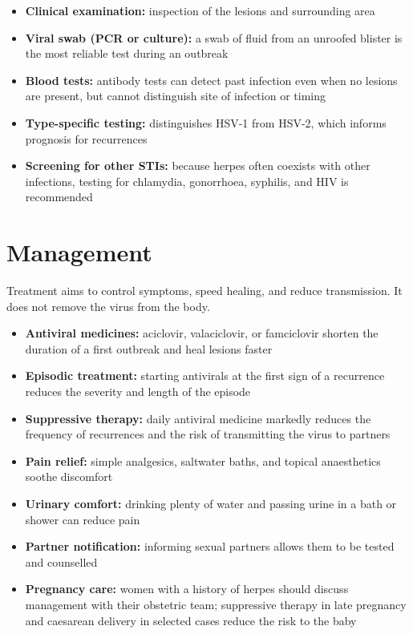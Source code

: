 \begin{itemize}
    \item \textbf{Clinical examination:} inspection of the lesions and surrounding area
    \item \textbf{Viral swab (PCR or culture):} a swab of fluid from an unroofed blister is the most reliable test during an outbreak
    \item \textbf{Blood tests:} antibody tests can detect past infection even when no lesions are present, but cannot distinguish site of infection or timing
    \item \textbf{Type-specific testing:} distinguishes HSV-1 from HSV-2, which informs prognosis for recurrences
    \item \textbf{Screening for other STIs:} because herpes often coexists with other infections, testing for chlamydia, gonorrhoea, syphilis, and HIV is recommended
\end{itemize}

\section*{Management}
Treatment aims to control symptoms, speed healing, and reduce transmission. It does not remove the virus from the body.

\begin{itemize}
    \item \textbf{Antiviral medicines:} aciclovir, valaciclovir, or famciclovir shorten the duration of a first outbreak and heal lesions faster
    \item \textbf{Episodic treatment:} starting antivirals at the first sign of a recurrence reduces the severity and length of the episode
    \item \textbf{Suppressive therapy:} daily antiviral medicine markedly reduces the frequency of recurrences and the risk of transmitting the virus to partners
    \item \textbf{Pain relief:} simple analgesics, saltwater baths, and topical anaesthetics soothe discomfort
    \item \textbf{Urinary comfort:} drinking plenty of water and passing urine in a bath or shower can reduce pain
    \item \textbf{Partner notification:} informing sexual partners allows them to be tested and counselled
    \item \textbf{Pregnancy care:} women with a history of herpes should discuss management with their obstetric team; suppressive therapy in late pregnancy and caesarean delivery in selected cases reduce the risk to the baby
\end{itemize}

